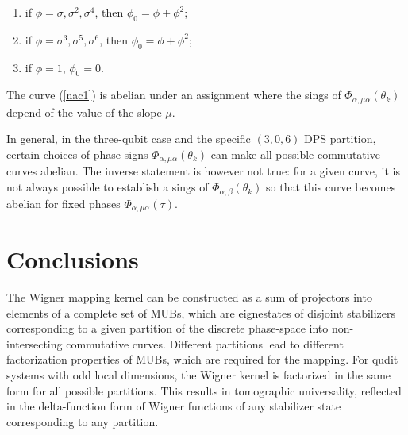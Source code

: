 \documentclass{article}
\begin{document}
\begin{enumerate}
\item if $\phi =\sigma ,\sigma ^{2},\sigma ^{4}$, then $\phi _{0}=\phi +\phi
^{2}$;

\item if $\phi =\sigma ^{3},\sigma ^{5},\sigma ^{6}$, then $\phi _{0}=\phi
+\phi ^{2}$;

\item if $\phi =1$, $\phi _{0}=0$.
\end{enumerate}

The curve (\ref{nac1}) is abelian under an assignment where the sings of $%
\Phi _{\alpha ,\mu \alpha }(\theta _{k})$ depend of the value of the slope $%
\mu $.

In general, in the three-qubit case and the specific $(3,0,6)$ DPS
partition, certain choices of phase signs $\Phi _{\alpha ,\mu \alpha
}(\theta _{k})$ can make all possible commutative curves abelian. The
inverse statement is however not true: for a given curve, it is not always
possible to establish a sings of $\Phi _{\alpha ,\beta }(\theta _{k})$ so
that this curve becomes abelian for fixed phases $\Phi _{\alpha ,\mu \alpha
}(\tau )$.

\section{Conclusions}

The Wigner mapping kernel can be constructed as a sum of projectors into
elements of a complete set of MUBs, which are eignestates of disjoint
stabilizers corresponding to a given partition of the discrete phase-space
into non-intersecting commutative curves. Different partitions lead to
different factorization properties of MUBs, which are required for the
mapping. For qudit systems with odd local dimensions, the Wigner kernel is
factorized in the same form for all possible partitions. This results in
tomographic universality, reflected in the delta-function form of Wigner
functions of any stabilizer state corresponding to any partition.
\end{document}

